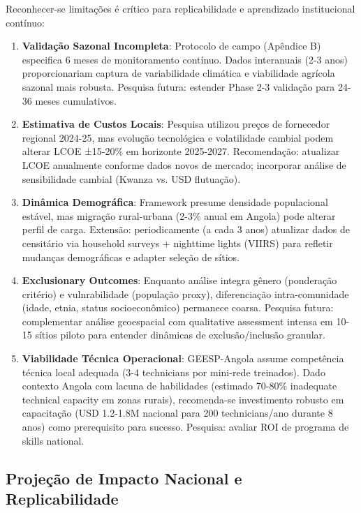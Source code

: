 \documentclass[12pt, a4paper]{article}
\begin{document}
Reconhecer-se limitações é crítico para replicabilidade e aprendizado institucional contínuo:

\begin{enumerate}
\item\textbf{Validação Sazonal Incompleta}: Protocolo de campo (Apêndice B) especifica 6 meses de monitoramento contínuo. Dados interanuais (2-3 anos) proporcionariam captura de variabilidade climática e viabilidade agrícola sazonal mais robusta. Pesquisa futura: estender Phase 2-3 validação para 24-36 meses cumulativos.

\item\textbf{Estimativa de Custos Locais}: Pesquisa utilizou preços de fornecedor regional 2024-25, mas evolução tecnológica e volatilidade cambial podem alterar LCOE ±15-20\% em horizonte 2025-2027. Recomendação: atualizar LCOE anualmente conforme dados novos de mercado; incorporar análise de sensibilidade cambial (Kwanza vs. USD flutuação).

\item\textbf{Dinâmica Demográfica}: Framework presume densidade populacional estável, mas migração rural-urbana (2-3\% anual em Angola) pode alterar perfil de carga. Extensão: periodicamente (a cada 3 anos) atualizar dados de censitário via household surveys + nighttime lights (VIIRS) para refletir mudanças demográficas e adapter seleção de sítios.

\item\textbf{Exclusionary Outcomes}: Enquanto análise integra gênero (ponderação critério) e vulnrabilidade (população proxy), diferenciação intra-comunidade (idade, etnia, status socioeconômico) permanece coarsa. Pesquisa futura: complementar análise geoespacial com qualitative assessment intensa em 10-15 sítios piloto para entender dinâmicas de exclusão/inclusão granular.

\item\textbf{Viabilidade Técnica Operacional}: GEESP-Angola assume competência técnica local adequada (3-4 technicians por mini-rede treinados). Dado contexto Angola com lacuna de habilidades (estimado 70-80\% inadequate technical capacity em zonas rurais), recomenda-se investimento robusto em capacitação (USD 1.2-1.8M nacional para 200 technicians/ano durante 8 anos) como prerequisito para sucesso. Pesquisa: avaliar ROI de programa de skills national.
\end{enumerate}

\subsection{Projeção de Impacto Nacional e Replicabilidade}
\end{document}
